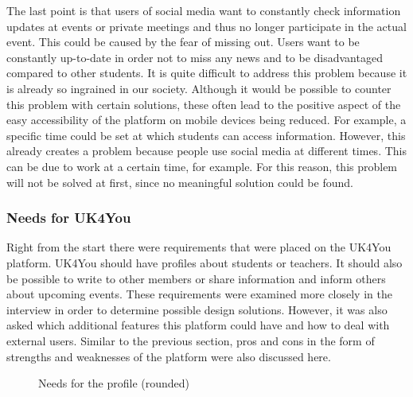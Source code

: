 The last point is that users of social media want to constantly check information updates at events or private meetings and thus no longer participate in the actual event.
This could be caused by the fear of missing out.
Users want to be constantly up-to-date in order not to miss any news and to be disadvantaged compared to other students.
It is quite difficult to address this problem because it is already so ingrained in our society.
Although it would be possible to counter this problem with certain solutions, these often lead to the positive aspect of the easy accessibility of the platform on mobile devices being reduced.
For example, a specific time could be set at which students can access information.
However, this already creates a problem because people use social media at different times.
This can be due to work at a certain time, for example.
For this reason, this problem will not be solved at first, since no meaningful solution could be found.

\subsubsection{Needs for UK4You}
Right from the start there were requirements that were placed on the UK4You platform.
UK4You should have profiles about students or teachers.
It should also be possible to write to other members or share information and inform others about upcoming events.
These requirements were examined more closely in the interview in order to determine possible design solutions.
However, it was also asked which additional features this platform could have and how to deal with external users.
Similar to the previous section, pros and cons in the form of strengths and weaknesses of the platform were also discussed here.

\begin{figure}[ht]
    \centering
    \caption{Needs for the profile (rounded)}
    \label{fig:pie-chart-profile}
\end{figure}

